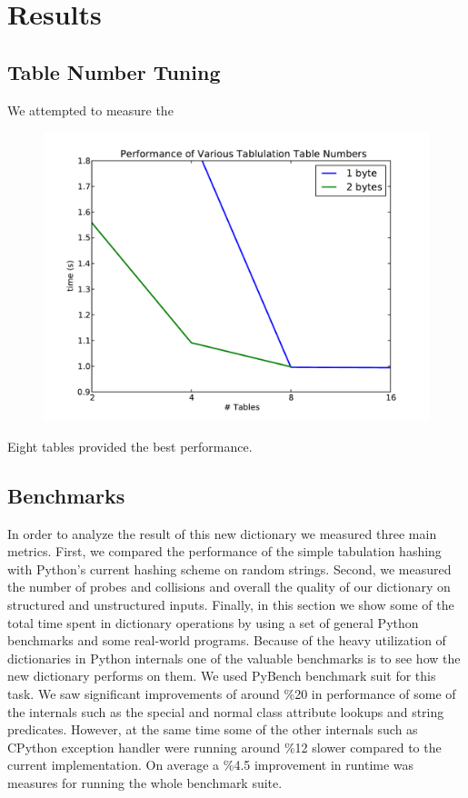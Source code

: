 \documentclass[12pt]{article}
\begin{document}
\section{Results}

\subsection{Table Number Tuning}
       
We attempted to measure the 
 \begin{figure}[H]
   \centering
   \includegraphics[width=5in]{tables.pdf}
   \caption{}
 \end{figure}
       
Eight tables provided the best performance.
\subsection{Benchmarks}
In order to analyze the result of this new dictionary we measured three main metrics. First, we compared the performance of the simple tabulation hashing with Python’s current hashing scheme on random strings. Second, we measured the number of probes and collisions and overall the quality of our dictionary on structured and unstructured inputs. Finally, in this section  we show some of the total time spent in dictionary operations by using a set of general Python benchmarks and some real-world programs.
Because of the heavy utilization of dictionaries in Python internals one of the valuable benchmarks is to see how the new dictionary performs on them. We used PyBench benchmark suit for this task. We saw significant improvements of around \%20 in performance of some of the internals such as the special and normal class attribute lookups and string predicates. However, at the same time some of the other internals such as CPython exception handler were running around \%12 slower compared to the current implementation. On average a \%4.5 improvement in runtime was measures for running the whole benchmark suite.
\end{document}
